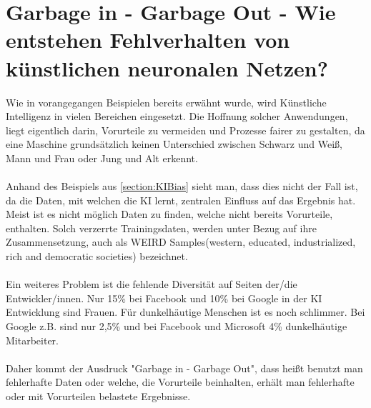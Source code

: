 \documentclass[12pt,oneside,a4paper,parskip]{scrbook}
\begin{document}
\section{Garbage in - Garbage Out - Wie entstehen Fehlverhalten von künstlichen neuronalen Netzen?}
Wie in vorangegangen Beispielen bereits erwähnt wurde, wird Künstliche Intelligenz in vielen Bereichen eingesetzt. Die Hoffnung solcher Anwendungen, liegt eigentlich darin, Vorurteile zu vermeiden und Prozesse fairer zu gestalten, da eine Maschine grundsätzlich keinen Unterschied zwischen Schwarz und Weiß, Mann und Frau oder Jung und Alt erkennt.
\\\\
Anhand des Beispiels aus \ref{section:KIBias} sieht man, dass dies nicht der Fall ist, da die Daten, mit welchen die KI lernt, zentralen Einfluss auf das Ergebnis hat. Meist ist es nicht möglich Daten zu finden, welche nicht bereits Vorurteile, enthalten. Solch verzerrte Trainingsdaten, werden unter Bezug auf ihre Zusammensetzung, auch als WEIRD Samples(western, educated, industrialized, rich and democratic societies) bezeichnet.%
\\\\
Ein weiteres Problem ist die fehlende Diversität auf Seiten der/die Entwickler/innen. Nur 15\% bei Facebook und 10\% bei Google in der KI Entwicklung sind Frauen. Für dunkelhäutige Menschen ist es noch schlimmer. Bei Google z.B. sind nur 2,5\% und bei Facebook und Microsoft 4\% dunkelhäutige Mitarbeiter\cite{Discriminating}.
\\\\
Daher kommt der Ausdruck "Garbage in - Garbage Out", dass heißt benutzt man fehlerhafte Daten oder welche, die Vorurteile beinhalten, erhält man fehlerhafte oder mit Vorurteilen belastete Ergebnisse.
\end{document}
